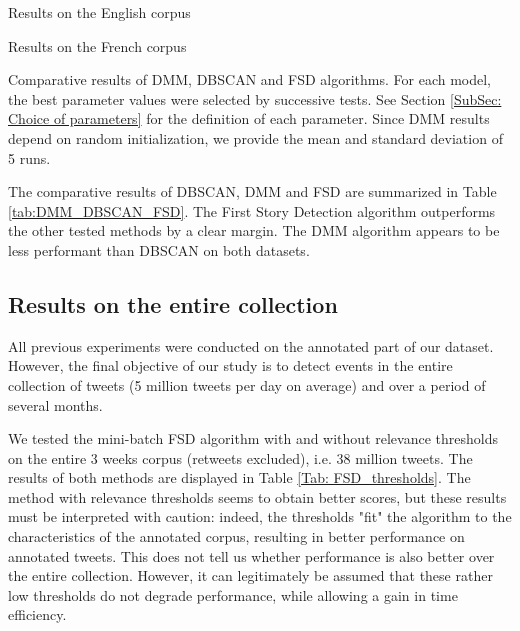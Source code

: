 \begin{table}[]
\begin{subtable}{1\textwidth}
    \label{tab:DMM_DBSCAN_FSD_en}
    \caption{Results on the English corpus}
\end{subtable}
\begin{subtable}{1\textwidth}
    \label{tab:DMM_DBSCAN_FSD_fr}
    \caption{Results on the French corpus}
\end{subtable}
\caption[Comparative results of DMM, DBSCAN and FSD algorithms]{Comparative results of DMM, DBSCAN and FSD algorithms. For each model, the best parameter values were selected by successive tests. See Section \ref{SubSec: Choice of parameters} for the definition of each parameter. Since DMM results depend on random initialization, we provide the mean and standard deviation of 5 runs.}
\label{tab:DMM_DBSCAN_FSD}
\end{table}


The comparative results of DBSCAN, DMM and FSD are summarized in Table \ref{tab:DMM_DBSCAN_FSD}. The First Story Detection algorithm outperforms the other tested methods by a clear margin. The DMM algorithm appears to be less performant than DBSCAN on both datasets.

\subsection{Results on the entire collection}
All previous experiments were conducted on the annotated part of our dataset. However, the final objective of our study is to detect events in the entire collection of tweets (5 million tweets per day on average) and over a period of several months. 

We tested the mini-batch FSD algorithm with and without relevance thresholds on the entire 3 weeks corpus (retweets excluded), i.e. 38 million tweets.  The results of both methods are displayed in Table \ref{Tab: FSD_thresholds}. The method with relevance thresholds seems to obtain better scores, but these results must be interpreted with caution: indeed, the thresholds "fit" the algorithm to the characteristics of the annotated corpus, resulting in better performance on annotated tweets. This does not tell us whether performance is also better over the entire collection. However, it can legitimately be assumed that these rather low thresholds do not degrade performance, while allowing a gain in time efficiency.

